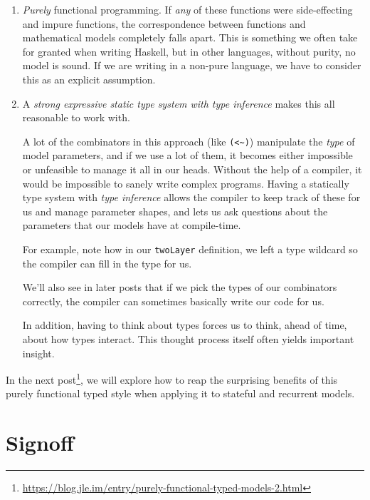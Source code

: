 \documentclass[]{article}
\renewcommand{\href}[2]{#2\footnote{\url{#1}}}
\begin{document}
\begin{enumerate}
  I'm not sure at this point if this is best when supported at the
  language/compiler level, or at the library level. Whatever it is, though, the
  combination of differentiable programming with higher-order functions and
  other functional programming fundamentals is what makes this particularly
  powerful.
\item
  \emph{Purely} functional programming. If \emph{any} of these functions were
  side-effecting and impure functions, the correspondence between functions and
  mathematical models completely falls apart. This is something we often take
  for granted when writing Haskell, but in other languages, without purity, no
  model is sound. If we are writing in a non-pure language, we have to consider
  this as an explicit assumption.
\item
  A \emph{strong expressive static type system with type inference} makes this
  all reasonable to work with.

  A lot of the combinators in this approach (like
  \texttt{(\textless{}\textasciitilde{})}) manipulate the \emph{type} of model
  parameters, and if we use a lot of them, it becomes either impossible or
  unfeasible to manage it all in our heads. Without the help of a compiler, it
  would be impossible to sanely write complex programs. Having a statically type
  system with \emph{type inference} allows the compiler to keep track of these
  for us and manage parameter shapes, and lets us ask questions about the
  parameters that our models have at compile-time.

  For example, note how in our \texttt{twoLayer} definition, we left a type
  wildcard so the compiler can fill in the type for us.

  We'll also see in later posts that if we pick the types of our combinators
  correctly, the compiler can sometimes basically write our code for us.

  In addition, having to think about types forces us to think, ahead of time,
  about how types interact. This thought process itself often yields important
  insight.
\end{enumerate}

In the
\href{https://blog.jle.im/entry/purely-functional-typed-models-2.html}{next
post}, we will explore how to reap the surprising benefits of this purely
functional typed style when applying it to stateful and recurrent models.

\hypertarget{signoff}{%
\section{Signoff}\label{signoff}}
\end{document}
